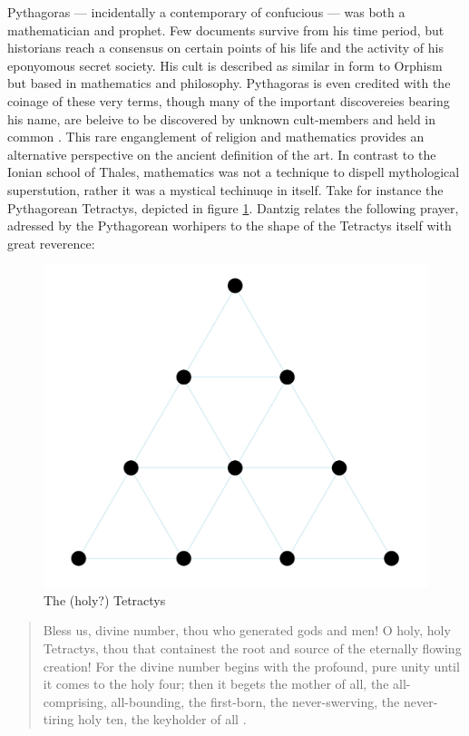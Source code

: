 \documentclass[12pt]{article}
\begin{document}
Pythagoras ---
incidentally a contemporary of confucious ---
was both a mathematician and prophet.
Few documents survive from his time period,
but historians reach a consensus on certain points
of his life and the activity
of his eponyomous secret society.
His cult is described as similar in form to Orphism
but based in mathematics and philosophy.
Pythagoras is even credited with
the coinage of these very terms,
though many of the important discovereies
bearing his name,
are beleive to be discovered by
unknown cult-members and held in common \cite{boyer1991}.
This rare enganglement of religion and mathematics
provides an alternative perspective on
the ancient definition of the art.
In contrast to the Ionian school of Thales,
mathematics was not a technique
to dispell mythological superstution,
rather it was a mystical techinuqe in itself.
Take for instance the Pythagorean Tetractys,
depicted in figure \ref{fig3}.
Dantzig relates the following prayer,
adressed by the Pythagorean worhipers
to the shape of the Tetractys itself
with great reverence:


\begin{figure}
	\includegraphics[scale=0.1]{tetractys.png}
	\centering
	\caption{The (holy?) Tetractys \cite{tetractys}}
	\label{fig3}
\end{figure}

\begin{quote}

	Bless us, divine number, thou who generated gods and men! O holy, holy Tetractys, thou that containest the root and source of the eternally flowing creation! For the divine number begins with the profound, pure unity until it comes to the holy four; then it begets the mother of all, the all-comprising, all-bounding, the first-born, the never-swerving, the never-tiring holy ten, the keyholder of all \cite{dantzig}.

\end{quote}
\end{document}
